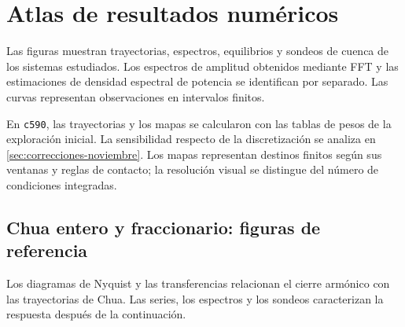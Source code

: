 \ifHAFOdigitalcontent
\section{Atlas de resultados numéricos}
\label{part:atlas}
Las figuras muestran trayectorias, espectros, equilibrios y sondeos de
cuenca de los sistemas estudiados. Los espectros de amplitud obtenidos mediante
FFT y las estimaciones de densidad espectral de potencia se identifican por
separado. Las curvas representan observaciones en intervalos finitos.

En \texttt{c590}, las trayectorias y los mapas se calcularon con las
tablas de pesos de la exploración inicial. La sensibilidad respecto de la
discretización se analiza en \cref{sec:correcciones-noviembre}. Los mapas
representan destinos finitos según sus ventanas y reglas de contacto; la
resolución visual se distingue del número de condiciones integradas.

\clearpage
\subsection{Chua entero y fraccionario: figuras de referencia}
Los diagramas de Nyquist y las transferencias relacionan el cierre
armónico con las trayectorias de Chua. Las series, los espectros y los
sondeos caracterizan la respuesta después de la continuación.

